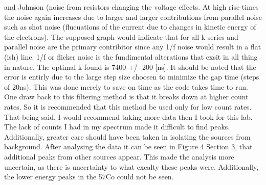  and Johnson (noise from resistors changing the voltage  effects. At high rise times the noise
again increases due to larger and larger contributions from parallel noise such as shot noise (flucuations of the current due to changes in kinetic energy of the electrons). The supposed graph
would indicate that for all k series and parallel noise are the primary contribitor since any 1/f noise would result in a flat (ish) line. 1/f or flicker noise is the fundimental alterations 
that exsit in all thing in nature. The optimal k found is 7400 +/- 200 [ns]. It should be noted that the error is entirly due to the large step size 
choosen to minimize the gap time (steps of 20ns). This was done merely to save on time as the code takes time to run.  
\linebreak
\linebreak
One draw back to this filtering method is that it breaks down at higher count rates. So it is recommended that this method be used only for low count rates. That being said, I would recommend 
taking more data then I took for this lab. The lack of counts I had in my spectrum made it difficult to find peaks. Additionally, greater care should have been taken in isolating the sources from 
background. After analysing the data it can be seen in Figure 4 Section 3, that additional peaks from other sources appear. This made the analysis more uncertain, as there is uncertainty to what 
excalty these peaks were. Additionally, the lower energy peaks in the 57Co could not be seen. 
